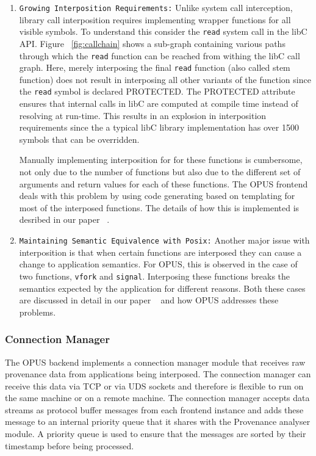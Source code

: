 \documentclass[withindex,glossary]{cam-thesis}
\begin{document}
\begin{enumerate}
\item \texttt{Growing Interposition Requirements:} Unlike system call interception, library call interposition requires implementing wrapper functions for all visible symbols. To understand this consider the \texttt{read} system call in the libC API. Figure ~\ref{fig:callchain} shows a sub-graph containing various paths through which the \texttt{read} function can be reached from withing the libC call graph. 
Here, merely interposing the final \texttt{read} function (also called stem function) does not result in interposing all other variants of the function since the \texttt{read} symbol is declared PROTECTED. The PROTECTED attribute ensures that internal calls in libC are computed at compile time instead of resolving at run-time.
This results in an explosion in interposition requirements since the a typical libC library implementation has over 1500 symbols that can be overridden. 

Manually implementing interposition for for these functions is cumbersome, not only due to the number of functions but also due to the different set of arguments and return values for each of these functions. The OPUS frontend deals with this problem by using code generating based on templating for most of the interposed functions. The details of how this is implemented is desribed in our paper ~\cite{OPUSLessons}.

\item \texttt{Maintaining Semantic Equivalence with Posix:} Another major issue with interposition is that when certain functions are interposed they can cause a change to application semantics. For OPUS, this is observed in the case of two functions, \texttt{vfork} and \texttt{signal}. Interposing these functions breaks the semantics expected by the application for different reasons. Both these cases are discussed in detail in our paper ~\cite{OPUSLessons} and how OPUS addresses these problems.

\end{enumerate}

\subsubsection{Connection Manager}
The OPUS backend implements a connection manager module that receives raw provenance data from applications being interposed.
The connection manager can receive this data via TCP or via UDS sockets and therefore is flexible to run on the same machine or on a remote machine.
The connection manager accepts data streams as protocol buffer messages from each frontend instance and adds these message to an internal priority queue that it shares with the Provenance analyser module.
A priority queue is used to ensure that the messages are sorted by their timestamp before being processed.
\end{document}
